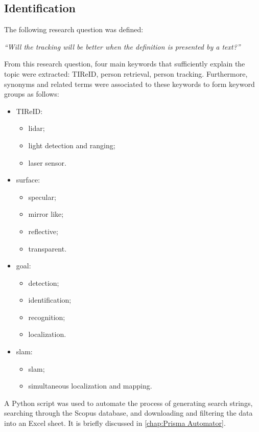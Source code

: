 \subsection*{Identification}

The following research question was defined:

\bigskip
\textit{``Will the tracking will be better when the definition is presented by a text?''}
\bigskip


From this research question, four main keywords that sufficiently explain the topic were extracted: TIReID, person retrieval, person tracking. Furthermore, synonyms and related terms were associated to these keywords to form keyword groups as follows:

\begin{itemize}
    \item TIReID:
    \begin{itemize}
        \item lidar;
        \item light detection and ranging;
        \item laser sensor.
    \end{itemize}
    \item surface:
    \begin{itemize}
        \item specular;
        \item mirror like;
        \item reflective;
        \item transparent.
    \end{itemize}
    \item goal:
    \begin{itemize}
        \item detection;
        \item identification;
        \item recognition;
        \item localization.
    \end{itemize}
    \item slam:
    \begin{itemize}
        \item slam;
        \item simultaneous localization and mapping.
    \end{itemize}
\end{itemize}

A Python script was used to automate the process of generating search strings, searching through the Scopus database, and downloading and filtering the data into an Excel sheet. It is briefly discussed in \autoref{chap:Prisma Automator}.

